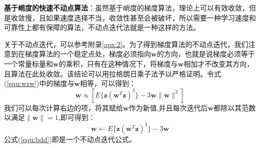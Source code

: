 \textbf{基于峭度的快速不动点算法}：虽然基于峭度的梯度算法，理论上可以有效收敛，但是收敛慢，且如果速度选择不当，收敛性甚至会被破坏，所以需要一种学习速度和可靠性上都有保障的算法，不动点迭代法就是一种这样的方法。

关于不动点迭代，可以参考附录\ref{apx:2}。为了得到梯度算法的不动点迭代，我们注意到在梯度算法的一个稳定点处，梯度必须指向$\mathbf{w}$的方向，也就是说梯度必须等于一个常量标量和$\mathbf{w}$的乘积，只有在这种情况下，将梯度与$\mathbf{w}$相加才不改变其方向，且算法在此处收敛。该结论可以用拉格朗日乘子法予以严格证明。令式(\ref{equ:wzw})中的梯度与$\mathbf{w}$相等，可以得到：
\begin{equation}
\mathbf{w} \propto [ E\{ \mathbf{z}(\mathbf{w}^T\mathbf{z})^3 \} - 3 \mathbf{w} \lVert \mathbf{w} \rVert^2 ]
\end{equation}
我们可以每次计算右边的项，将其赋给$\mathbf{w}$作为新值,并且每次迭代后$\mathbf{w}$都除以其范数以满足$\lVert \mathbf{w} \rVert =1 $,即可得到：
\begin{equation}
\mathbf{w} \leftarrow E\{ \mathbf{z}(\mathbf{w}^T\mathbf{z})^3 \} - 3 \mathbf{w} \label{equ:bdd}
\end{equation}
公式(\ref{equ:bdd})即是一个不动点迭代公式。